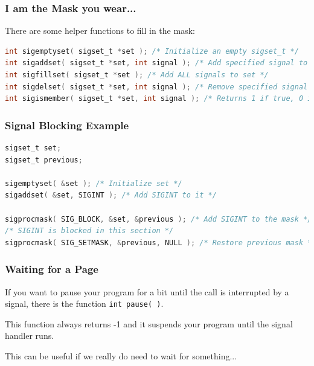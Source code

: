 \begin{frame}[fragile]
	\frametitle{I am the Mask you wear...}

	There are some helper functions to fill in the mask:
	\begin{lstlisting}[language=C]
int sigemptyset( sigset_t *set ); /* Initialize an empty sigset_t */
int sigaddset( sigset_t *set, int signal ); /* Add specified signal to set */
int sigfillset( sigset_t *set ); /* Add ALL signals to set */
int sigdelset( sigset_t *set, int signal ); /* Remove specified signal from set */
int sigismember( sigset_t *set, int signal ); /* Returns 1 if true, 0 if false */
\end{lstlisting}

\end{frame}


\begin{frame}[fragile]
	\frametitle{Signal Blocking Example}

	\begin{lstlisting}[language=C]
sigset_t set;
sigset_t previous;

sigemptyset( &set ); /* Initialize set */
sigaddset( &set, SIGINT ); /* Add SIGINT to it */

sigprocmask( SIG_BLOCK, &set, &previous ); /* Add SIGINT to the mask */
/* SIGINT is blocked in this section */
sigprocmask( SIG_SETMASK, &previous, NULL ); /* Restore previous mask */

\end{lstlisting}

\end{frame}


\begin{frame}
	\frametitle{Waiting for a Page}

	If you want to pause your program for a bit until the call is interrupted by a signal, there is the function \texttt{int pause( )}.

	This function always returns -1 and it suspends your program until the signal handler runs.

	This can be useful if we really do need to wait for something...

\end{frame}



